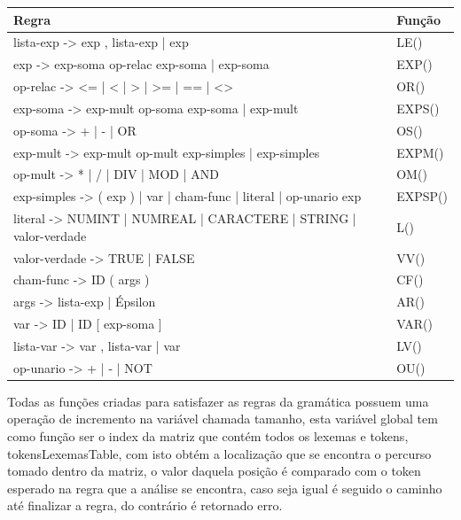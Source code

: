 \documentclass[12pt,oneside,a4paper,chapter=TITLE,section=TITLE,sumario=tradicional]{abntex2}
\begin{document}
\begin{quadro}[htb]
    \centering
    \vspace{0.5cm}
    \begin{tabular}[h]{|p{13.0cm}|p{2.0cm}|}
        \hline
        \textbf{Regra} & \textbf{Função} \\ 
        \hline\hline
	lista-exp  -> exp , lista-exp | exp  & LE() \\ \hline 
	exp -> exp-soma op-relac exp-soma | exp-soma  & EXP() \\ \hline 
	op-relac -> <= | < | > | >= | == | <>  & OR()   \\ \hline 
	exp-soma -> exp-mult op-soma exp-soma | exp-mult  & EXPS()   \\ \hline 
	op-soma -> + | - | OR  & OS()   \\ \hline 
	exp-mult -> exp-mult op-mult exp-simples | exp-simples  & EXPM()   \\ \hline 
	op-mult -> * | / | DIV | MOD | AND  & OM()   \\ \hline 
	exp-simples -> ( exp ) | var | cham-func | literal | op-unario exp  & EXPSP()   \\ \hline 
	literal -> NUMINT | NUMREAL | CARACTERE | STRING | valor-verdade  & L()   \\ \hline 
	valor-verdade -> TRUE | FALSE  & VV()   \\ \hline 
	cham-func -> ID ( args )  & CF()   \\ \hline 
	args -> lista-exp | Épsilon  & AR()   \\ \hline 
	var -> ID | ID [ exp-soma ]  & VAR()   \\ \hline 
	lista-var  -> var , lista-var | var  & LV()   \\ \hline 
	op-unario -> + | - | NOT  & OU()   \\ \hline 
    \end{tabular}
\end{quadro}

Todas as funções criadas para satisfazer as regras da gramática possuem uma operação de incremento na variável chamada tamanho, esta variável global tem como função ser o index da matriz que contém todos os lexemas e tokens, tokensLexemasTable, com isto obtém a localização que se encontra o percurso tomado dentro da matriz, o valor daquela posição é comparado com o token esperado na regra que a análise se encontra, caso seja igual é seguido o caminho até finalizar a regra, do contrário é retornado erro.
\end{document}
